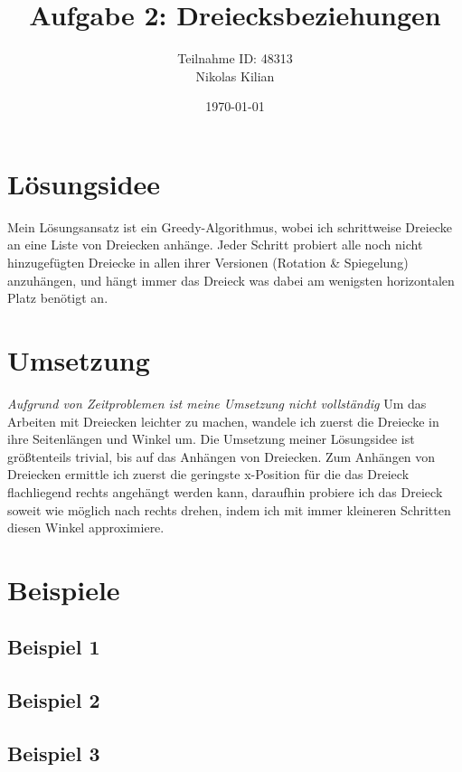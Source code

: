 \documentclass[12pt]{article}
\title{\vspace{-2.0cm}Aufgabe 2: Dreiecksbeziehungen}
\author{Teilnahme ID: 48313\\Nikolas Kilian}
\date{\today}
\begin{document}
\maketitle
\tableofcontents

\section{Lösungsidee}
Mein Lösungsansatz ist ein Greedy-Algorithmus, wobei ich schrittweise Dreiecke an eine Liste von Dreiecken anhänge. Jeder Schritt probiert alle noch nicht hinzugefügten Dreiecke in allen ihrer Versionen (Rotation \& Spiegelung) anzuhängen, und hängt immer das Dreieck was dabei am wenigsten horizontalen Platz benötigt an.

\section{Umsetzung}
\textit{Aufgrund von Zeitproblemen ist meine Umsetzung nicht vollständig}
Um das Arbeiten mit Dreiecken leichter zu machen, wandele ich zuerst die Dreiecke in ihre Seitenlängen und Winkel um.
Die Umsetzung meiner Lösungsidee ist größtenteils trivial, bis auf das Anhängen von Dreiecken.
Zum Anhängen von Dreiecken ermittle ich zuerst die geringste x-Position für die das Dreieck flachliegend rechts angehängt werden kann, daraufhin probiere ich das Dreieck soweit wie möglich nach rechts drehen, indem ich mit immer kleineren Schritten diesen Winkel approximiere.

\section{Beispiele}
\newcommand{\Ex}[2]{
\frame{\texttt{[image: \#2]}}
}

\subsection{Beispiel 1}
\begin{center}
\Ex{0.98}{Ex1}
\end{center}

\subsection{Beispiel 2}
\begin{center}
\Ex{0.75}{Ex2}
\end{center}

\subsection{Beispiel 3}
\begin{center}
\Ex{0.65}{Ex3}
\end{center}
\end{document}

